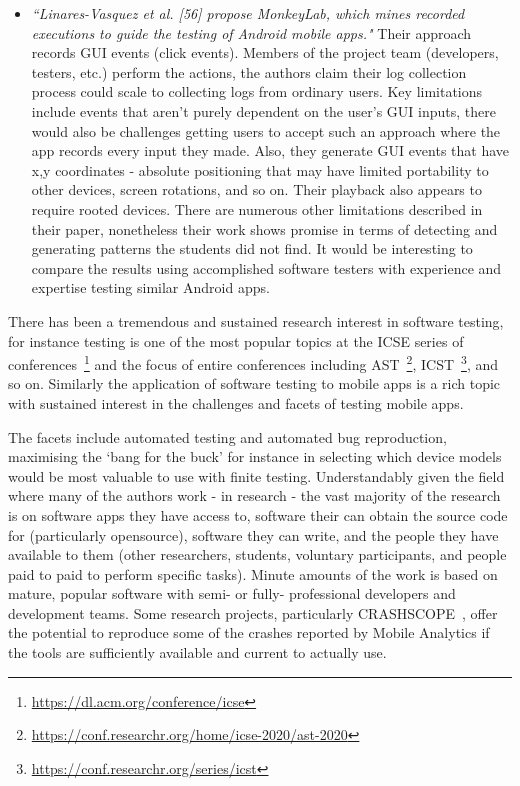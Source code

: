 \begin{itemize}
    \item \emph{``Linares-Vasquez et al. [56] propose MonkeyLab, which mines recorded executions to guide the testing of Android mobile apps."} Their approach records GUI events (click events). Members of the project team (developers, testers, etc.) perform the actions, the authors claim their log collection process could scale to collecting logs from ordinary users. Key limitations include events that aren't purely dependent on the user's GUI inputs, there would also be challenges getting users to accept such an approach where the app records every input they made. Also, they generate GUI events that have x,y coordinates - absolute positioning that may have limited portability to other devices, screen rotations, and so on. Their playback also appears to require rooted devices. There are numerous other limitations described in their paper, nonetheless their work shows promise in terms of detecting and generating patterns the students did not find. It would be interesting to compare the results using accomplished software testers with experience and expertise testing similar Android apps.
\end{itemize}

There has been a tremendous and sustained research interest in software testing, for instance testing is one of the most popular topics at the ICSE series of conferences~\footnote{\url{https://dl.acm.org/conference/icse}} and the focus of entire conferences including AST~\footnote{\url{https://conf.researchr.org/home/icse-2020/ast-2020}}, ICST~\footnote{\url{https://conf.researchr.org/series/icst}}, and so on. Similarly the application of software testing to mobile apps is a rich topic with sustained interest in the challenges and facets of testing mobile apps.

The facets include automated testing and automated bug reproduction, maximising the `bang for the buck' for instance in selecting which device models would be most valuable to use with finite testing. Understandably given the field where many of the authors work - in research - the vast majority of the research is on software apps they have access to, software their can obtain the source code for (particularly opensource), software they can write, and the people they have available to them (other researchers, students, voluntary participants, and people paid to paid to perform specific tasks). Minute amounts of the work is based on mature, popular software with semi- or fully- professional developers and development teams. Some research projects, particularly CRASHSCOPE~\citep{moran2016_automatically_drr_android_app_crashes}, offer the potential to reproduce some of the crashes reported by Mobile Analytics if the tools are sufficiently available and current to actually use.




